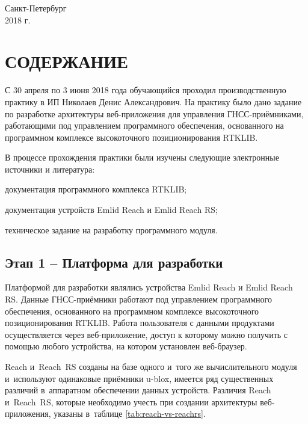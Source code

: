 \documentclass[pta]{../../../scs-iam}
\begin{document}
\begin{center}
  {
    \normalsize
    Санкт-Петербург \\
    2018 г.
  }
\end{center}

\restoregeometry
\normalsize

\clearpage

\setcounter{page}{2}

\section*{СОДЕРЖАНИЕ}
\tableofcontents

\newpage


С 30 апреля по 3 июня 2018 года обучающийся проходил производственную практику в ИП Николаев Денис Александрович. На практику было дано задание по разработке архитектуры веб-приложения для управления ГНСС-приёмниками, работающими под управлением программного обеспечения, основанного на программном комплексе высокоточного позиционирования RTKLIB.

В процессе прохождения практики были изучены следующие электронные источники и литература:
\begin{dashitemize}
  \item документация программного комплекса RTKLIB;
  \item документация устройств Emlid Reach и Emlid Reach RS;
  \item техническое задание на разработку программного модуля.
\end{dashitemize}


\subsection{Этап 1 -- Платформа для разработки}

Платформой для разработки являлись устройства Emlid Reach и Emlid Reach RS. Данные ГНСС-приёмники работают под управлением программного обеспечения, основанного на программном комплексе высокоточного позиционирования RTKLIB. Работа пользователя с данными продуктами осуществляется через веб-приложение, доступ к которому можно получить с помощью любого устройства, на котором установлен веб-браузер.

Reach и~Reach~RS созданы на базе одного и~того же вычислительного модуля и~используют одинаковые приёмники u-blox, имеется ряд существенных различий в~аппаратном обеспечении данных устройств. Различия Reach и~Reach~RS, которые необходимо учесть при создании архитектуры веб-приложения, указаны в~таблице \ref{tab:reach-vs-reachrs}.
\end{document}
